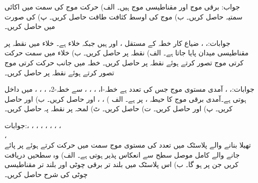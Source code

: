جواب:
برقی موج  اور مقناطیسی موج
  ہیں۔ الف) حرکت موج کی سمت میں اکائی سمتیہ حاصل کریں۔ ب) موج کی اوسط کثافت طاقت حاصل کریں۔ پ)  کی صورت میں  حاصل کریں۔

جوابات:، ، 
ضیاع کار خطہ  کے مستقل ،  اور  ہیں  جبکہ  خلاء ہے۔ خلاء میں نقطہ  پر مقناطیسی میدان  پایا جاتا ہے۔ الف) نقطہ  پر  حاصل کریں۔ ب) خلاء میں  سمت حرکت کرتی موج تصور کرتے ہوئے  نقطہ  پر
  حاصل کریں۔ خطہ  میں  جانب حرکت کرتی موج تصور کرتے ہوئے  نقطہ  پر  حاصل کریں۔

جوابات:، 
،
آمدی مستوی موج جس کی تعدد  ہے خطہ-ا، ، ، ،  سے  خطہ-2، ، ، ،  میں داخل ہوتی ہے۔آمدی برقی موج کا حیطہ ،   پر  ہے۔ الف ) ، ،   اور  حاصل کریں۔ ب)  اور  حاصل کریں۔ پ)  اور  حاصل کریں۔ ت)  حاصل کریں۔ ٹ) لمحہ  پر نقطہ  پہ  حاصل کریں۔

جوابات:، ، ،
 ، ، ،
 ،
 ،\\
  ، \\ 
تھیلا بنانے والے پلاسٹک میں  تعدد کی مستوی موج  سمت میں حرکت کرتے ہوئے   پر پائے جانے والے کامل موصل سطح سے انعکاس پذیر ہوتی ہے۔ الف) وہ سطحیں دریافت کریں جن پر  ہو گا۔ ب) اس پلاسٹک  میں بلند تر برقی چوٹی اور بلند تر مقناطیسی چوٹی کی شرح حاصل کریں۔ 

